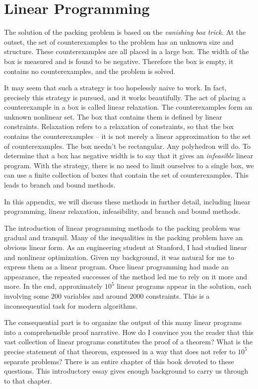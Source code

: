 \clearpage
\section{Linear Programming}

The solution of the packing problem is based on the {\it vanishing
box trick.}  At the outset, the set of 
counterexamples to the problem has an unknown size and structure.
These counterexamples are all placed in a large box.   
The width of the box is measured and is found to be negative.
Therefore the box is empty, it contains no counterexamples, and
the problem is solved.

It may seem that such a strategy is too hopelessly naive to work.
In fact, precisely this strategy is pursued, and it works beautifully.
The act of placing a counterexample in a box is called linear 
relaxation.  The counterexamples form an unknown nonlinear set.
The box that contains them is defined by linear constraints.  
Relaxation refers to a relaxation of constraints, so that the
box contains the counterexamples -- it is not merely a linear
approximation to the set of counterexamples.  The box needn't be
rectangular.  Any polyhedron will do.  To determine that a box
has negative width is to say that it gives an {\it infeasible} linear
program.  With the strategy, there is no need to limit ourselves
to a single box, we can use a finite collection of boxes that
contain the set of counterexamples.  This leads to branch and bound
methods.


In this appendix, we will discuss these methods in further detail,
including linear programming, linear relaxation,  infeasibility,
and branch and bound methods.

The introduction of linear programming methods to the packing
problem was gradual and tranquil.  
Many of the
inequalities in the packing problem have an obvious linear form.
As an engineering student
at Stanford, I had studied
linear and nonlinear optimization.
Given my background, 
it was natural for me to express them as a linear program.  
Once linear programming had made an appearance, the 
repeated successes of the method led me to rely on it more and more.
In the end, approximately $10^5$ linear programs appear in the solution,
each involving some $200$ variables and around $2000$ constraints.
This is a inconsequential task for modern algorithms.  

The consequential part is to organize the output of this many linear
programs into a comprehensible proof narrative.  How do I convince you
the reader that this vast collection of linear programs constitutes
the proof of a theorem?  What is the precise statement of that
theorem, expressed in a way that does not refer to $10^5$ separate
problems? There is an entire chapter of this book devoted to these
questions.  This introductory essay gives enough background to carry
us through to that chapter.


